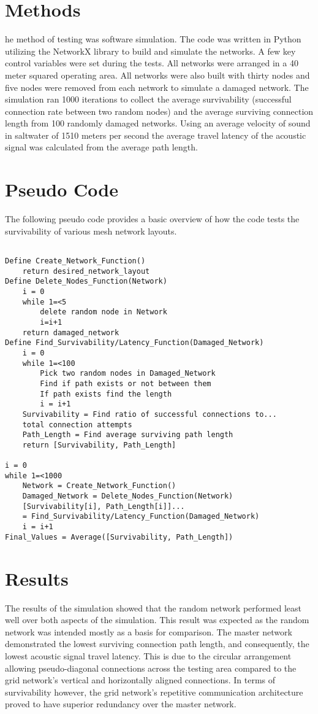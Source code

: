 \documentclass[10pt]{article}
\begin{document}
\section{Methods}
he method of testing was software simulation. The code was written in Python utilizing the NetworkX library to build and simulate the networks. A few key control variables were set during the tests. All networks were arranged in a 40 meter squared operating area. All networks were also built with thirty nodes and five nodes were removed from each network to simulate a damaged network. The simulation ran 1000 iterations to collect the average survivability (successful connection rate between two random nodes) and the average surviving connection length from 100 randomly damaged networks. Using an average velocity of sound in saltwater of 1510 meters per second the average travel latency of the acoustic signal was calculated from the average path length.

\section{Pseudo Code}
The following pseudo code provides a basic overview of how the code tests the survivability of various mesh network layouts. 
\lstset{basicstyle=\footnotesize}
\begin{lstlisting}

Define Create_Network_Function()
	return desired_network_layout
Define Delete_Nodes_Function(Network)
	i = 0
	while 1=<5
		delete random node in Network 
		i=i+1
	return damaged_network
Define Find_Survivability/Latency_Function(Damaged_Network)
	i = 0
	while 1=<100
		Pick two random nodes in Damaged_Network
		Find if path exists or not between them
		If path exists find the length
		i = i+1
	Survivability = Find ratio of successful connections to... 
	total connection attempts
	Path_Length = Find average surviving path length
	return [Survivability, Path_Length]

i = 0
while 1=<1000
	Network = Create_Network_Function()
	Damaged_Network = Delete_Nodes_Function(Network)
	[Survivability[i], Path_Length[i]]...
	= Find_Survivability/Latency_Function(Damaged_Network)
	i = i+1
Final_Values = Average([Survivability, Path_Length])
\end{lstlisting}

\section{Results}
The results of the simulation showed that the random network performed least well over both aspects of the simulation. This result was expected as the random network was intended mostly as a basis for comparison. The master network demonstrated the lowest surviving connection path length, and consequently, the lowest acoustic signal travel latency.  This is due to the circular arrangement allowing pseudo-diagonal connections across the testing area compared to the grid network’s vertical and horizontally aligned connections. In terms of survivability however, the grid network’s repetitive communication architecture proved to have superior redundancy over the master network. 
\end{document}

